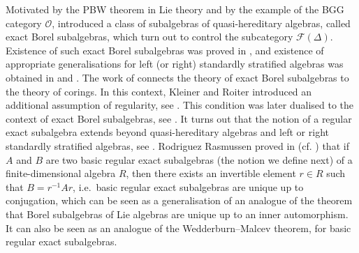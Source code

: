 \documentclass[12pt,a4paper]{amsart}
\theoremstyle{plain}
\theoremstyle{definition}
\numberwithin{equation}{thm}
\begin{document}
Motivated by the PBW theorem in Lie theory and by the example of the BGG category $\mathcal{O}$, \cite{Koe95} introduced a class of subalgebras of quasi-hereditary algebras, called exact Borel subalgebras, which turn out to control the subcategory $\mathcal{F}(\Delta)$. Existence of such exact Borel subalgebras was proved in \cite{KKO14}, and existence of appropriate generalisations for left (or right) standardly stratified algebras was obtained in \cite{BPS23} and \cite{Got24}. The work of \cite{KKO14} connects the theory of exact Borel subalgebras to the theory of corings. In this context, Kleiner and Roiter introduced an additional assumption of regularity, see \cite{KR77}. This condition was later dualised to the context of exact Borel subalgebras, see \cite{BKK20, KM25}. It turns out that the notion of a regular exact subalgebra extends beyond quasi-hereditary algebras and left or right standardly stratified algebras, see \cite{Kul25}. Rodriguez Rasmussen proved in \cite{RR25} (cf. \cite{KM25}) that if $A$ and $B$ are two basic regular exact subalgebras (the notion we define next) of a finite-dimensional algebra $R$, then there exists an invertible element $r\in R$ such that $B=r^{-1}Ar$, i.e.\ basic regular exact subalgebras are unique up to conjugation, which can be seen as a generalisation of an analogue of the theorem that Borel subalgebras of Lie algebras are unique up to an inner automorphism. It can also be seen as an analogue of the Wedderburn--Malcev theorem, for basic regular exact subalgebras. 
\end{document}
